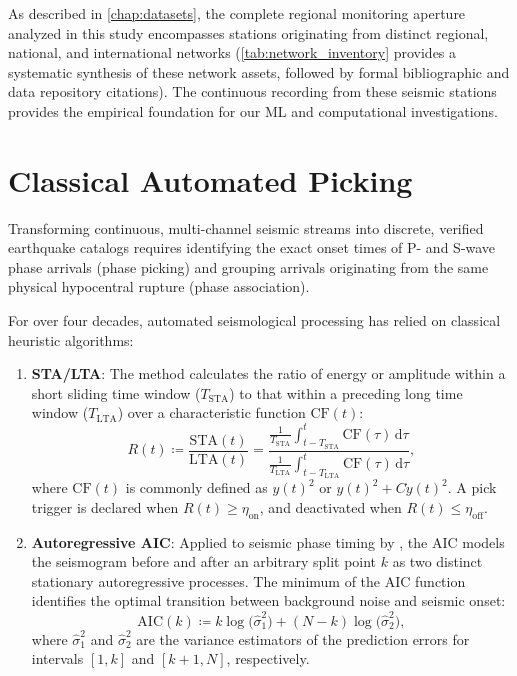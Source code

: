 As described in \cref{chap:datasets}, the complete regional monitoring aperture
analyzed in this study encompasses  stations
originating from  distinct regional,
national, and international networks (\cref{tab:network_inventory} provides a
  systematic synthesis of these network assets, followed by formal
bibliographic and data repository citations). The continuous
recording from these seismic stations provides the empirical
foundation for our \ac{ML} and computational investigations.

\section{Classical Automated Picking}
\label{sec:classical_picking}

Transforming continuous, multi-channel seismic streams into discrete, verified
earthquake catalogs requires identifying the exact onset times of P- and S-wave
phase arrivals (phase picking) and grouping arrivals originating from the same
physical hypocentral rupture (phase association).

For over four decades, automated seismological processing has relied on
classical heuristic algorithms:
\begin{enumerate}
  \item \textbf{\acf{STA/LTA}}: The method calculates the ratio of energy or
    amplitude within a short sliding time window ($T_{\mathrm{STA}}$) to that
    within a preceding long time window ($T_{\mathrm{LTA}}$) over a
    characteristic function $\mathrm{CF}(t)$:
    \begin{equation}
      R(t) \coloneqq \frac{\mathrm{STA}(t)}{\mathrm{LTA}(t)} =
      \frac{\frac{1}{T_{\mathrm{STA}}}\int_{t - T_{\mathrm{STA}}}^t
      \mathrm{CF}(\tau)\,\mathrm{d}\tau}{\frac{1}{T_{\mathrm{LTA}}}\int_{t
      - T_{\mathrm{LTA}}}^t\mathrm{CF}(\tau)\,\mathrm{d}\tau},
      \label{eq:stalta}
    \end{equation}
    where $\mathrm{CF}(t)$ is commonly defined as $y(t)^2$ or $y(t)^2 +
    C \dot{y}(t)^2$. A pick trigger is declared when $R(t) \ge
    \eta_{\mathrm{on}}$, and deactivated when $R(t) \le \eta_{\mathrm{off}}$.
  \item \textbf{Autoregressive \ac{AIC}}: Applied to seismic phase timing by
    \textcite{LEONARD1999247}, the \ac{AIC} models the seismogram before and
    after an arbitrary split point $k$ as two distinct stationary
    autoregressive processes. The minimum of the \ac{AIC} function identifies
    the optimal transition between background noise and seismic onset:
    \begin{equation}
      \mathrm{AIC}(k) \coloneqq k \log\bigl(\hat{\sigma}_1^2\bigr) + (N - k)
      \log\bigl(\hat{\sigma}_2^2\bigr),
      \label{eq:aic}
    \end{equation}
    where $\hat{\sigma}_1^2$ and $\hat{\sigma}_2^2$ are the variance estimators
    of the prediction errors for intervals $[1, k]$ and $[k + 1, N]$,
    respectively.
\end{enumerate}

